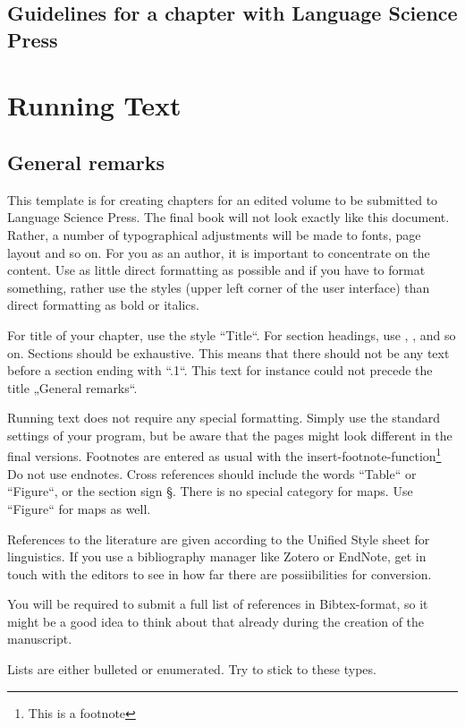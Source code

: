 
\section{Guidelines for a chapter with Language Science Press}
\chapter{Running Text}

\section{General remarks}

This template is for creating chapters for an edited volume to be submitted to Language Science Press. The final book will not look exactly like this document. Rather, a number of typographical adjustments will be made to fonts, page layout and so on. For  you as an author, it is important to concentrate on the content. Use as little direct formatting as possible and if you have to format something, rather use the styles (upper left corner of the user interface) than direct formatting as bold or italics.  

For title of your chapter, use the style “Title“. For section headings, use , ,  and so on.  Sections should be exhaustive. This means that there should not be any text before a section ending with “.1“. This text for instance could not precede the title „General remarks“. 

Running text does not require any special formatting. Simply use the standard settings of your program, but be aware that the pages might look different in the final versions. Footnotes are entered as usual with the insert-footnote-function\footnote{This is a footnote} Do not use endnotes. Cross references should include the words “Table“ or “Figure“, or the section sign §. There is no special category for maps. Use “Figure“ for maps as well. 

References to the literature are given according to the Unified Style sheet for linguistics. If you use a bibliography manager like Zotero or EndNote, get in touch with the editors to see in how far there are possiibilities for conversion. 

You will be required to submit a full list of references in Bibtex-format, so it might be a good idea to think about that already during the creation of the manuscript.

Lists are either bulleted or enumerated. Try to stick to these types. 

